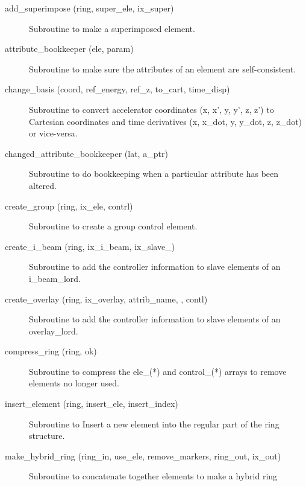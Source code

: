 \begin{description}

\item[add\_superimpose (ring, super\_ele, ix\_super)] \Newline
Subroutine to make a superimposed element. 

\item[attribute\_bookkeeper (ele, param)] \Newline
Subroutine to make sure the attributes of an element are self-consistent. 

\item[change\_basis (coord, ref\_energy, ref\_z, to\_cart, time\_disp)] \Newline
Subroutine to convert accelerator coordinates (x, x', y, y', z, z') to
Cartesian coordinates and time derivatives (x, x\_dot, y, y\_dot, z,
z\_dot) or vice-versa.

\item[changed\_attribute\_bookkeeper (lat, a\_ptr)] \Newline 
Subroutine to do bookkeeping when a particular attribute has been altered.

\item[create\_group (ring, ix\_ele, contrl)] \Newline
Subroutine to create a group control element. 

\item[create\_i\_beam (ring, ix\_i\_beam, ix\_slave\_)] \Newline 
     Subroutine to add the controller information to slave elements of
     an i\_beam\_lord.

\item[create\_overlay (ring, ix\_overlay, attrib\_name, , contl)] \Newline
Subroutine to add the controller information to slave elements of an 
overlay\_lord. 

\item[compress\_ring (ring, ok)] \Newline
Subroutine to compress the ele\_(*) and control\_(*) arrays to remove
elements no longer used.

\item[insert\_element (ring, insert\_ele, insert\_index)] \Newline
Subroutine to Insert a new element into the regular part of the 
ring structure. 

\item[make\_hybrid\_ring (ring\_in, use\_ele, remove\_markers, ring\_out, ix\_out)] \Newline
Subroutine to concatenate together elements to make a hybrid ring 


\end{description}
